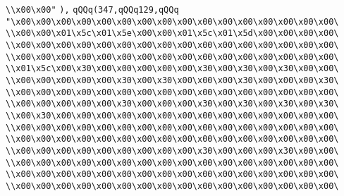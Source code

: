 \verb|\\x00\x00"|\newline
\verb|),|\newline
\verb|qQQq(347,qQQq129,qQQq|\newline
\verb|"\x00\x00\x00\x00\x00\x00\x00\x00\x00\x00\x00\x00\x00\x00\x00\x00\|\newline
\verb|\\x00\x00\x01\x5c\x01\x5e\x00\x00\x01\x5c\x01\x5d\x00\x00\x00\x00\|\newline
\verb|\\x00\x00\x00\x00\x00\x00\x00\x00\x00\x00\x00\x00\x00\x00\x00\x00\|\newline
\verb|\\x00\x00\x00\x00\x00\x00\x00\x00\x00\x00\x00\x00\x00\x00\x00\x00\|\newline
\verb|\\x01\x5c\x00\x30\x00\x00\x00\x00\x00\x30\x00\x30\x00\x30\x00\x00\|\newline
\verb|\\x00\x00\x00\x00\x00\x30\x00\x30\x00\x00\x00\x30\x00\x00\x00\x30\|\newline
\verb|\\x00\x00\x00\x00\x00\x00\x00\x00\x00\x00\x00\x00\x00\x00\x00\x00\|\newline
\verb|\\x00\x00\x00\x00\x00\x30\x00\x00\x00\x30\x00\x30\x00\x30\x00\x30\|\newline
\verb|\\x00\x30\x00\x00\x00\x00\x00\x00\x00\x00\x00\x00\x00\x00\x00\x00\|\newline
\verb|\\x00\x00\x00\x00\x00\x00\x00\x00\x00\x00\x00\x00\x00\x00\x00\x00\|\newline
\verb|\\x00\x00\x00\x00\x00\x00\x00\x00\x00\x00\x00\x00\x00\x00\x00\x00\|\newline
\verb|\\x00\x00\x00\x00\x00\x00\x00\x00\x00\x30\x00\x00\x00\x30\x00\x00\|\newline
\verb|\\x00\x00\x00\x00\x00\x00\x00\x00\x00\x00\x00\x00\x00\x00\x00\x00\|\newline
\verb|\\x00\x00\x00\x00\x00\x00\x00\x00\x00\x00\x00\x00\x00\x00\x00\x00\|\newline
\verb|\\x00\x00\x00\x00\x00\x00\x00\x00\x00\x00\x00\x00\x00\x00\x00\x00\|\newline

